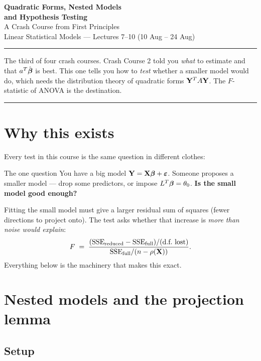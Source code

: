 \documentclass[11pt]{article}
\begin{document}
\begin{center}
{\LARGE\bfseries Quadratic Forms, Nested Models\\ and Hypothesis Testing}\\[4pt]
{\large A Crash Course from First Principles}\\[3pt]
{\small Linear Statistical Models --- Lectures 7--10 (10 Aug -- 24 Aug)}
\end{center}
\vspace{2pt}\hrule\vspace{10pt}

\noindent The third of four crash courses. Crash Course 2 told you \emph{what} to estimate
and that $a^T\hat{\boldsymbol{\beta}}$ is best. This one tells you how to \emph{test} whether a smaller model
would do, which needs the distribution theory of quadratic forms $\mathbf{Y}^TA\mathbf{Y}$. The
$F$-statistic of ANOVA is the destination.

\tableofcontents
\vspace{8pt}\hrule\vspace{10pt}

\section{Why this exists}

Every test in this course is the same question in different clothes:

\begin{idea}{The one question}
You have a big model $\mathbf{Y}=\mathbf{X}\boldsymbol{\beta}+\boldsymbol{\varepsilon}$. Someone proposes a smaller model --- drop some
predictors, or impose $L^T\boldsymbol{\beta}=\theta_0$. \textbf{Is the small model good enough?}

Fitting the small model must give a larger residual sum of squares (fewer directions to
project onto). The test asks whether that increase is \emph{more than noise would explain}:
\[
  F \;=\; \frac{(\mathrm{SSE}_{\text{reduced}}-\mathrm{SSE}_{\text{full}})/(\text{d.f.\ lost})}
              {\mathrm{SSE}_{\text{full}}/(n-\rho(\bX))} .
\]
Everything below is the machinery that makes this exact.
\end{idea}

\section{Nested models and the projection lemma}

\subsection{Setup}
\end{document}

